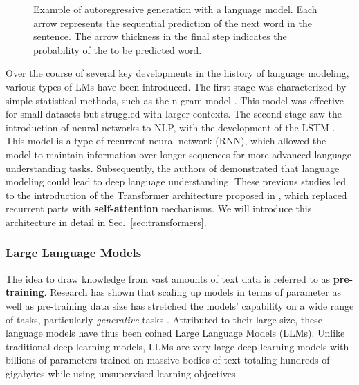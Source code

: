 \begin{figure}[htbp]
    \centering
    
    \caption[Example of autoregressive generation with a language model]{Example
    of autoregressive generation with a language model. Each arrow represents
    the sequential prediction of the next word in the sentence. The arrow
    thickness in the final step indicates the probability of the to be predicted
    word.} 
    \label{fig:lm_generation}
\end{figure}

Over the course of several key developments in the history of language modeling,
various types of LMs have been introduced. The first stage was characterized by
simple statistical methods, such as the n-gram model \cite{brown1992class}. This
model was effective for small datasets but struggled with larger contexts. The
second stage saw the introduction of neural networks to NLP, with the
development of the LSTM \cite{hochreiter1997long}. This model is a type of
recurrent neural network (RNN), which allowed the model to maintain information
over longer sequences for more advanced language understanding tasks.
Subsequently, the authors of \cite{dai2015semi} demonstrated that language
modeling could lead to deep language understanding. These previous studies led
to the introduction of the Transformer architecture proposed in
\cite{vaswani2017attention}, which replaced recurrent parts with
\textbf{self-attention} mechanisms. We will introduce this architecture in
detail in Sec.~\ref{sec:transformers}.

\subsubsection{Large Language Models}
The idea to draw knowledge from vast amounts of text data is referred to as
\textbf{pre-training}. Research has shown that scaling up models in terms of
parameter as well as pre-training data size has stretched the models' capability
on a wide range of tasks, particularly \textit{generative} tasks
\cite{min2023recent}. Attributed to their large size, these language models have
thus been coined Large Language Models (LLMs). Unlike traditional deep learning
models, LLMs are very large deep learning models with billions of parameters
trained on massive bodies of text totaling hundreds of gigabytes while using
unsupervised learning objectives. 

